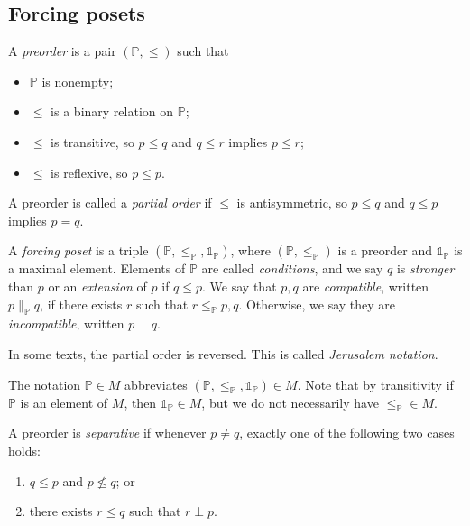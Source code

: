 \subsection{Forcing posets}
\begin{definition}
    A \emph{preorder} is a pair \( (\mathbb P, \leq) \) such that
    \begin{itemize}
        \item \( \mathbb P \) is nonempty;
        \item \( \leq \) is a binary relation on \( \mathbb P \);
        \item \( \leq \) is transitive, so \( p \leq q \) and \( q \leq r \) implies \( p \leq r \);
        \item \( \leq \) is reflexive, so \( p \leq p \).
    \end{itemize}
    A preorder is called a \emph{partial order} if \( \leq \) is antisymmetric, so \( p \leq q \) and \( q \leq p \) implies \( p = q \).
\end{definition}
\begin{definition}
    A \emph{forcing poset} is a triple \( (\mathbb P, \leq_{\mathbb P}, \Bbbone_{\mathbb P}) \), where \( (\mathbb P, \leq_{\mathbb P}) \) is a preorder and \( \Bbbone_{\mathbb P} \) is a maximal element.
    Elements of \( \mathbb P \) are called \emph{conditions}, and we say \( q \) is \emph{stronger} than \( p \) or an \emph{extension} of \( p \) if \( q \leq p \).
    We say that \( p, q \) are \emph{compatible}, written \( p \mathrel{\|}_{\mathbb P} q \), if there exists \( r \) such that \( r \leq_{\mathbb P} p, q \).
    Otherwise, we say they are \emph{incompatible}, written \( p \perp q \).
\end{definition}
\begin{remark}
    In some texts, the partial order is reversed.
    This is called \emph{Jerusalem notation}.
\end{remark}
The notation \( \mathbb P \in M \) abbreviates \( (\mathbb P, \leq_{\mathbb P}, \Bbbone_{\mathbb P}) \in M \).
Note that by transitivity if \( \mathbb P \) is an element of \( M \), then \( \Bbbone_{\mathbb P} \in M \), but we do not necessarily have \( {\leq_{\mathbb P}} \in M \).
\begin{definition}
    A preorder is \emph{separative} if whenever \( p \neq q \), exactly one of the following two cases holds:
    \begin{enumerate}
        \item \( q \leq p \) and \( p \nleq q \); or
        \item there exists \( r \leq q \) such that \( r \perp p \).
    \end{enumerate}
\end{definition}
